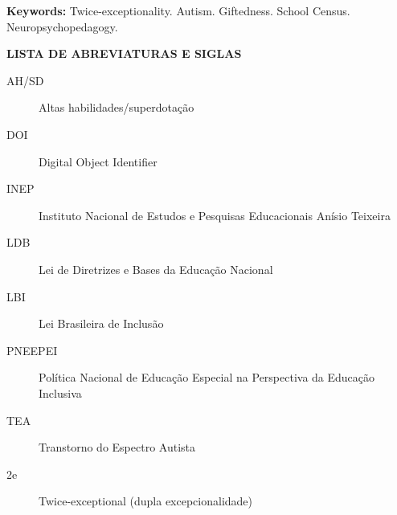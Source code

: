 \vspace{1em}
\noindent\textbf{Keywords:} Twice-exceptionality. Autism. Giftedness. School Census. Neuropsychopedagogy.
\endgroup

\clearpage

\begin{center}
\textbf{LISTA DE ABREVIATURAS E SIGLAS}
\end{center}

\begingroup
{}
\begin{description}
\item[AH/SD] Altas habilidades/superdotação
\item[DOI] Digital Object Identifier
\item[INEP] Instituto Nacional de Estudos e Pesquisas Educacionais Anísio Teixeira
\item[LDB] Lei de Diretrizes e Bases da Educação Nacional
\item[LBI] Lei Brasileira de Inclusão
\item[PNEEPEI] Política Nacional de Educação Especial na Perspectiva da Educação Inclusiva
\item[TEA] Transtorno do Espectro Autista
\item[2e] Twice-exceptional (dupla excepcionalidade)
\end{description}
\endgroup

\clearpage

